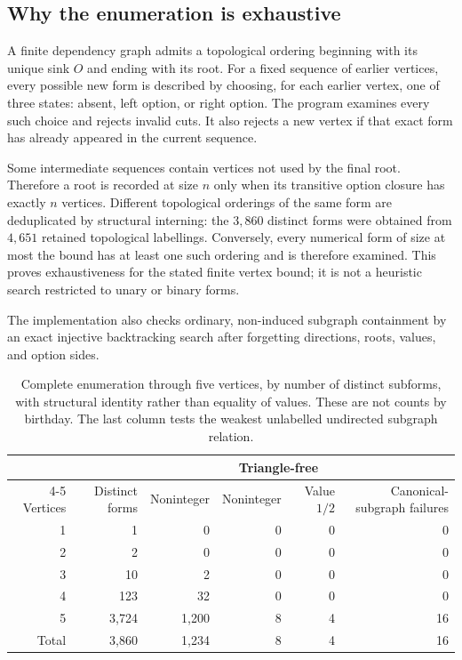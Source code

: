 \documentclass[11pt,a4paper]{article}
\numberwithin{equation}{section}
\theoremstyle{definition}
\theoremstyle{remark}
\begin{document}
\subsection{Why the enumeration is exhaustive}

A finite dependency graph admits a topological ordering beginning with its
unique sink $O$ and ending with its root. For a fixed sequence of earlier
vertices, every possible new form is described by choosing, for each earlier
vertex, one of three states: absent, left option, or right option. The program
examines every such choice and rejects invalid cuts. It also rejects a new
vertex if that exact form has already appeared in the current sequence.

Some intermediate sequences contain vertices not used by the final root.
Therefore a root is recorded at size $n$ only when its transitive option closure
has exactly $n$ vertices. Different topological orderings of the same form are
deduplicated by structural interning: the $3{,}860$ distinct forms were obtained
from $4{,}651$ retained topological labellings. Conversely, every numerical form
of size at most the bound has at least one such ordering and is therefore
examined. This proves exhaustiveness for the stated finite vertex bound; it is
not a heuristic search restricted to unary or binary forms.

The implementation also checks ordinary, non-induced subgraph containment by
an exact injective backtracking search after forgetting directions, roots,
values, and option sides.

\begin{table}[htbp]
\centering
\begin{tabular}{@{}rrrrrr@{}}
\toprule
& & & \multicolumn{2}{c}{Triangle-free} & \\
\cmidrule(lr){4-5}
Vertices & Distinct forms & Noninteger & Noninteger & Value $1/2$
 & Canonical-subgraph failures\\
\midrule
1&1&0&0&0&0\\
2&2&0&0&0&0\\
3&10&2&0&0&0\\
4&123&32&0&0&0\\
5&3,724&1,200&8&4&16\\
\midrule
Total&3,860&1,234&8&4&16\\
\bottomrule
\end{tabular}
\caption{Complete enumeration through five vertices, by number of distinct
subforms, with structural identity rather than equality of values. These are not
counts by birthday. The last column tests the weakest unlabelled undirected
subgraph relation.}
\label{tab:enumeration}
\end{table}
\end{document}
